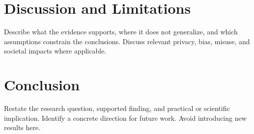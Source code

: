 \section{Discussion and Limitations}
Describe what the evidence supports, where it does not generalize,
and which assumptions constrain the conclusions. Discuss relevant
privacy, bias, misuse, and societal impacts where applicable.

\section{Conclusion}
Restate the research question, supported finding, and practical or
scientific implication. Identify a concrete direction for future work.
Avoid introducing new results here.
